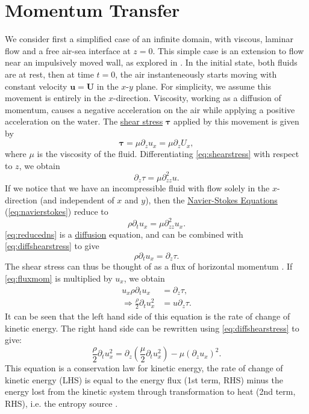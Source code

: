 \documentclass{report}
\newcommand{\vel}{\bm{u}}
\begin{document}
\chapter{Momentum Transfer}\label{momentumtransfer}
We consider first a simplified case of an infinite domain, with viscous, laminar flow and a free air-sea interface at $z=0$. 
This simple case is an extension to flow near an impulsively moved wall, as explored in \citet{harlen14c6}.
In the initial state, both fluids are at rest, then at time $t=0$, the air instanteneously starts moving with constant velocity $\vel=\bm{U}$ in the $x$-$y$ plane.
For simplicity, we assume this movement is entirely in the $x$-direction.
Viscosity, working as a diffusion of momentum, causes a negative acceleration on the air while applying a positive acceleration on the water.
The   \hyperref[def:shearstress]{shear stress}   $\bm{\tau}$ applied by this movement is given by
\begin{equation}
\bm{\tau} = \mu \partial_z u_x =\mu \partial_z U_x,
\label{eq:shearstress}
\end{equation}
where $\mu$ is the viscosity of the fluid.
Differentiating \ref{eq:shearstress} with respect to $z$, we obtain
\begin{equation}
\partial_z \tau =\mu \partial^2_{zz} u.
\label{eq:diffshearstress}
\end{equation}
If we notice that we have an incompressible fluid with flow solely in the $x$-direction (and independent of $x$ and $y$), then the \hyperref[def:navierstokes]{Navier-Stokes Equations} (\ref{eq:navierstokes}) reduce to
\begin{equation}
\rho \partial_t u_x = \mu \partial^2_{zz} u_x.
\label{eq:reducedns}
\end{equation}
\ref{eq:reducedns} is a \hyperref[diffusion]{diffusion} equation, and can be combined with \ref{eq:diffshearstress} to give
\begin{equation}
\rho\partial_t u_x = \partial_z \tau.
\label{eq:fluxmom}
\end{equation}
The shear stress can thus be thought of as a flux of horizontal momentum \citep{csanady04}.
If \ref{eq:fluxmom} is multiplied by $u_x$, we obtain
\begin{align}
u_x \rho \partial_t u_x &= \partial_z \tau,\\
\Rightarrow \frac{\rho}{2} \partial_t u_x^2 &= u\partial_z \tau. 
\end{align}
It can be seen that the left hand side of this equation is the rate of change of kinetic energy.
The right hand side can be rewritten using \ref{eq:diffshearstress} to give:
\begin{equation}
\frac{\rho}{2} \partial_t u_x^2 = \partial_z \left( \frac{\mu}{2} \partial_t u_x^2 \right) -\mu (\partial_z u_x)^2.
\end{equation}
This equation is a conservation law for kinetic energy, the rate of change of kinetic energy (LHS) is equal to the energy flux (1st term, RHS) minus the energy lost from the kinetic system through transformation to heat (2nd term, RHS), i.e. the entropy source \citep{csanady04}.
\end{document}
